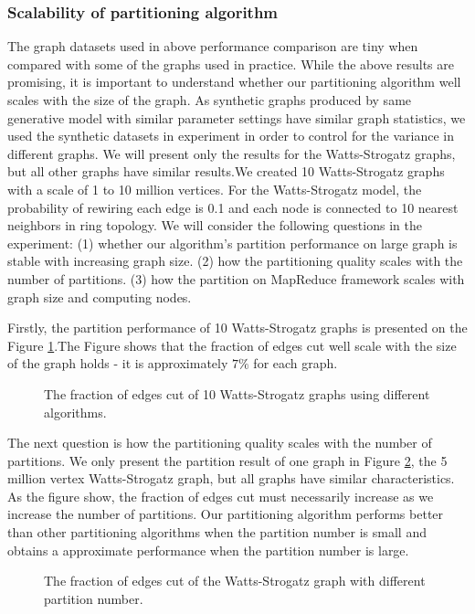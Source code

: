 \documentclass{acm_proc_article-sp}
\begin{document}
\subsubsection{Scalability of partitioning algorithm}
The graph datasets used in above performance comparison are tiny when compared with some of the graphs used in practice. While the above results are promising, it is important to understand whether our partitioning algorithm well scales with the size of the graph. As synthetic graphs produced by same generative model with similar parameter settings have similar graph statistics, we used the synthetic datasets in experiment in order to control for the variance in different graphs. We will present only the results for the Watts-Strogatz graphs, but all other graphs have similar results.We created 10 Watts-Strogatz graphs with a scale of 1 to 10 million vertices. For the Watts-Strogatz model, the probability of rewiring each edge is 0.1 and each node is connected to 10 nearest neighbors in ring topology. We will consider the following questions in the experiment: (1) whether our algorithm's partition performance on large graph is stable with increasing graph size. (2) how the partitioning quality scales with the number of partitions. (3) how the partition on MapReduce framework scales with graph size and computing nodes.
\par
Firstly, the partition performance of 10 Watts-Strogatz graphs is presented on the Figure \ref{fig:datasize}.The Figure shows that the fraction of edges cut well scale with the size of the graph holds - it is approximately $7\%$ for each graph.
\begin{figure}
\centering
{}
\caption{The fraction of edges cut of 10 Watts-Strogatz graphs using different algorithms.}
\label{fig:datasize}
\end{figure}

The next question is how the partitioning quality scales with the number of partitions. We only present the partition result of one graph in Figure \ref{fig:parNum}, the 5 million  vertex Watts-Strogatz graph, but all graphs have similar characteristics. As the figure show, the fraction
of edges cut must necessarily increase as we increase the number of partitions. Our partitioning algorithm performs better than other partitioning algorithms when the partition number is small and obtains a approximate performance when the partition number is large.
\begin{figure}
\centering
{}
\caption{The fraction of edges cut of the Watts-Strogatz graph with different partition number.}
\label{fig:parNum}
\end{figure}
\end{document}
